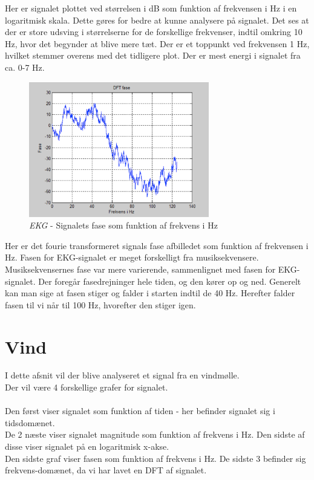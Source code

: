 Her er signalet plottet ved størrelsen i dB som funktion af frekvensen i Hz i en logaritmisk skala. Dette gøres for bedre at kunne analysere på signalet. Det ses at der er store udsving i størrelserne for de forskellige frekvenser, indtil omkring 10 Hz, hvor det begynder at blive mere tæt. Der er et toppunkt ved frekvensen 1 Hz, hvilket stemmer overens med det tidligere plot. Der er mest energi i signalet fra ca. 0-7 Hz.

\begin{figure}[H]
	\centering
	\includegraphics[width=0.7\textwidth]{Figurer/EKG4}
	\caption{\textit{EKG} - Signalets fase som funktion af frekvens i Hz}
\end{figure}

Her er det fourie transformeret signals fase afbilledet som funktion af frekvensen i Hz. Fasen for EKG-signalet er meget forskelligt fra musiksekvensere. Musiksekvensernes fase var mere varierende, sammenlignet med fasen for EKG-signalet. Der foregår fasedrejninger hele tiden, og den kører op og ned. Generelt kan man sige at fasen stiger og falder i starten indtil de 40 Hz. Herefter falder fasen til vi når til 100 Hz, hvorefter den stiger igen. 


\chapter{Vind}
I dette afsnit vil der blive analyseret et signal fra en vindmølle. \\
Der vil være 4 forskellige grafer for signalet.\\ \\
Den først viser signalet som funktion af tiden - her befinder signalet sig i tidsdomænet. \\
De 2 næste viser signalet magnitude som funktion af frekvens i Hz. Den sidste af disse viser signalet på en logaritmisk x-akse. \\
Den sidste graf viser fasen som funktion af frekvens i Hz. De sidste 3 befinder sig frekvens-domænet, da vi har lavet en DFT af signalet.


